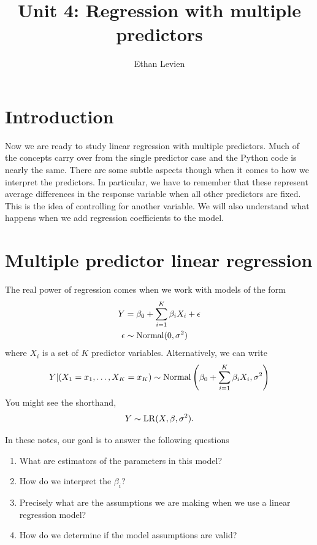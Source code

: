 
\setcounter{unit}{4}
\setcounter{section}{0}




\title{Unit 4: Regression with multiple predictors}
\author{Ethan Levien}
\maketitle


\section*{Introduction}
Now we are ready to study linear regression with multiple predictors. Much of the concepts carry over from the single predictor case and the Python code is nearly the same. There are some subtle aspects though when it comes to how we interpret the predictors. In particular, we have to remember that these represent average differences in the response variable when all other predictors are fixed. This is the idea of controlling for another variable. We will also understand what happens when we add regression coefficients to the model. 

\section{Multiple predictor linear regression}
The real power of regression comes when we work with models of the form 
\begin{align}
Y &= \beta_0 + \sum_{i=1}^K \beta_iX_i + \epsilon\\
\epsilon &\sim {\rm Normal}(0,\sigma^2)
\end{align}
where $X_i$ is a set of $K$ predictor variables. Alternatively, we can write
\begin{equation}
Y|(X_1=x_1,\dots,X_K=x_K) \sim {\rm Normal}\left( \beta_0 + \sum_{i=1}^K \beta_iX_i,\sigma^2\right)
\end{equation}
You might see the shorthand, 
\begin{equation}
Y \sim {\rm LR}(X,\beta,\sigma^2). 
\end{equation}

In these notes, our goal is to answer the following questions
\begin{enumerate}
\item What are estimators of the parameters in this model?
\item How do we interpret the  $\beta_i$? 
\item Precisely what are the assumptions we are making when we use a linear regression model? 
\item How do we determine if the model assumptions are valid? 
\end{enumerate}



